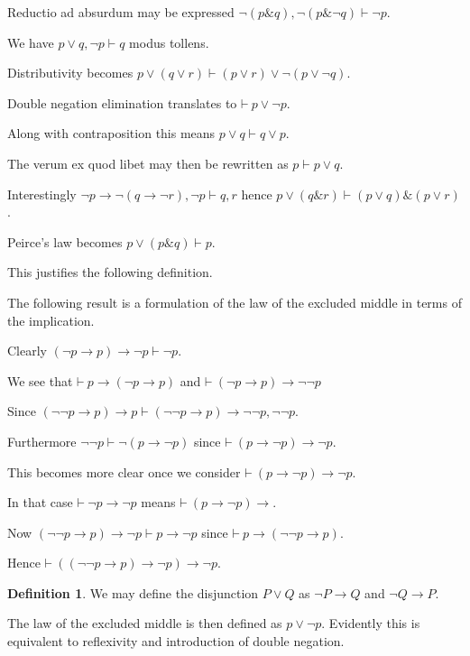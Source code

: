 \documentclass{amsbook}
\newcommand{\infers}{\mathrel\vdash}
\newcommand{\theorem}{\mathord\vdash\medspace}
\newcommand{\then}{\mathrel\rightarrow}
\newcommand{\conj}{\mathrel\&}
\newcommand{\disj}{\mathrel\vee}
\theoremstyle{definition}
\newtheorem{dfn}{Definition}[section]
\begin{document}
Reductio ad absurdum may be expressed $\neg(p \conj q), \neg(p \conj \neg q) \infers \neg p$.



We have $p \disj q, \neg p \infers q$ modus tollens.

Distributivity becomes $p \disj (q \disj r) \infers (p \disj r) \disj \neg(p \disj \neg q)$.

Double negation elimination translates to $\theorem p \disj \neg p$.

Along with contraposition this means $p \disj q \infers q \disj p$.

The verum ex quod libet may then be rewritten as $p \infers p \disj q$.

Interestingly $\neg p \then \neg(q \then \neg r), \neg p \infers q, r$ hence $p \disj (q \conj r) \infers (p \disj q) \conj (p \disj r)$.

Peirce's law becomes $p \vee (p \conj q) \infers p$.


\newpage


This justifies the following definition.

The following result is a formulation of the law of the excluded middle in terms of the implication.

Clearly $(\neg p \then p) \then \neg p \infers \neg p$.

We see that $\theorem p \then (\neg p \then p)$ and $\theorem (\neg p \then p) \then \neg\neg p$

Since $(\neg\neg p \then p) \then p \infers (\neg\neg p \then p) \then \neg\neg p, \neg\neg p$.

Furthermore $\neg\neg p \infers \neg(p \then \neg p)$ since $\theorem (p \then \neg p)\then \neg p$.

This becomes more clear once we consider $\theorem (p \then \neg p) \then \neg p$.

In that case $\theorem \neg p \then \neg p$ means $\theorem (p \then \neg p)\then $.

Now $(\neg\neg p \then p) \then \neg p \infers p \then \neg p$
since $\theorem p \then (\neg\neg p \then p)$.

Hence $\theorem ((\neg\neg p \then p) \then \neg p) \then \neg p$.

\begin{dfn}
    We may define the disjunction $P \vee Q$ as $\neg P \then Q$ and $\neg Q \then P$.
\end{dfn}

The law of the excluded middle is then defined as $p \vee \neg p$. Evidently this is equivalent to reflexivity and introduction of double negation.
\end{document}
